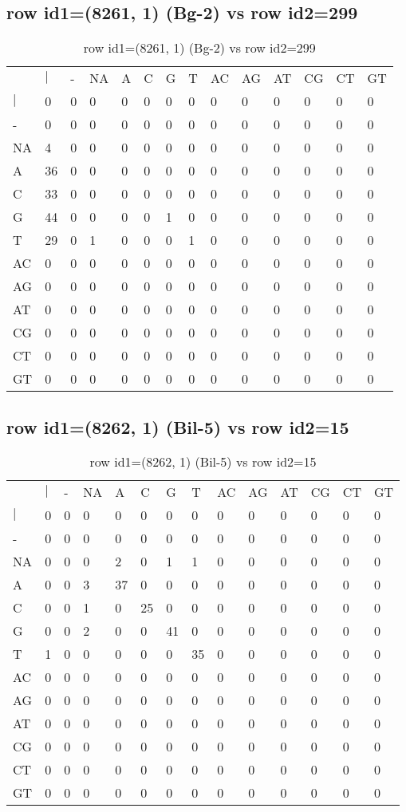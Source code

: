 \subsection{row id1=(8261, 1) (Bg-2) vs row id2=299}
\begin{center}
\begin{longtable}{|l|l|l|l|l|l|l|l|l|l|l|l|l|l|}
\caption{row id1=(8261, 1) (Bg-2) vs row id2=299} \label{table_dm208}\\
\hline
\\
\hline
&$|$&-&NA&A&C&G&T&AC&AG&AT&CG&CT&GT\\
$|$&0&0&0&0&0&0&0&0&0&0&0&0&0\\
-&0&0&0&0&0&0&0&0&0&0&0&0&0\\
NA&4&0&0&0&0&0&0&0&0&0&0&0&0\\
A&36&0&0&0&0&0&0&0&0&0&0&0&0\\
C&33&0&0&0&0&0&0&0&0&0&0&0&0\\
G&44&0&0&0&0&1&0&0&0&0&0&0&0\\
T&29&0&1&0&0&0&1&0&0&0&0&0&0\\
AC&0&0&0&0&0&0&0&0&0&0&0&0&0\\
AG&0&0&0&0&0&0&0&0&0&0&0&0&0\\
AT&0&0&0&0&0&0&0&0&0&0&0&0&0\\
CG&0&0&0&0&0&0&0&0&0&0&0&0&0\\
CT&0&0&0&0&0&0&0&0&0&0&0&0&0\\
GT&0&0&0&0&0&0&0&0&0&0&0&0&0\\
\hline
\end{longtable}
\end{center}

\subsection{row id1=(8262, 1) (Bil-5) vs row id2=15}
\begin{center}
\begin{longtable}{|l|l|l|l|l|l|l|l|l|l|l|l|l|l|}
\caption{row id1=(8262, 1) (Bil-5) vs row id2=15} \label{table_dm210}\\
\hline
\\
\hline
&$|$&-&NA&A&C&G&T&AC&AG&AT&CG&CT&GT\\
$|$&0&0&0&0&0&0&0&0&0&0&0&0&0\\
-&0&0&0&0&0&0&0&0&0&0&0&0&0\\
NA&0&0&0&2&0&1&1&0&0&0&0&0&0\\
A&0&0&3&37&0&0&0&0&0&0&0&0&0\\
C&0&0&1&0&25&0&0&0&0&0&0&0&0\\
G&0&0&2&0&0&41&0&0&0&0&0&0&0\\
T&1&0&0&0&0&0&35&0&0&0&0&0&0\\
AC&0&0&0&0&0&0&0&0&0&0&0&0&0\\
AG&0&0&0&0&0&0&0&0&0&0&0&0&0\\
AT&0&0&0&0&0&0&0&0&0&0&0&0&0\\
CG&0&0&0&0&0&0&0&0&0&0&0&0&0\\
CT&0&0&0&0&0&0&0&0&0&0&0&0&0\\
GT&0&0&0&0&0&0&0&0&0&0&0&0&0\\
\hline
\end{longtable}
\end{center}

